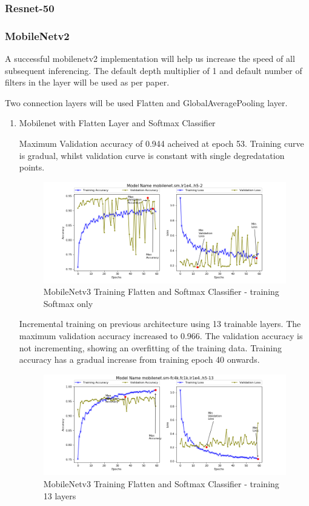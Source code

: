 \documentclass{IEEEtran}
\begin{document}
\subsubsection{Resnet-50}



\subsubsection{MobileNetv2}

A successful mobilenetv2 implementation will help us increase the speed of all subsequent inferencing. The default depth multiplier of 1 and default number of filters in the layer will be used as per paper. 

Two connection layers will be used Flatten and GlobalAveragePooling layer.

\begin{enumerate}
\item Mobilenet with Flatten Layer and Softmax Classifier 

Maximum Validation accuracy of 0.944 acheived at epoch 53. Training curve is gradual, whilst validation curve is constant with single degredatation points.

\begin{figure}[H]
\centering
\label{fig:mob3-1}
\includegraphics[scale=0.6]{images/mob3-1.png}
\caption{MobileNetv3 Training Flatten and Softmax Classifier - training Softmax only}
\end{figure}

Incremental training on previous architecture using 13 trainable layers. The maximum validation accuracy increased to 0.966. The validation accuracy is not incrementing, showing an overfitting of the training data. Training accuracy has a gradual increase from training epoch 40 onwards.

\begin{figure}[H]
\centering
\label{fig:mob3-2}
\includegraphics[scale=0.6]{images/mob3-2.png}
\caption{MobileNetv3 Training Flatten and Softmax Classifier - training 13 layers}
\end{figure}


\end{enumerate}
\end{document}
